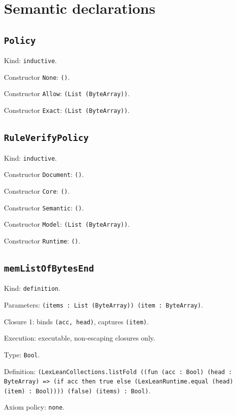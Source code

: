 \documentclass[11pt]{article}
\begin{document}
\section*{Semantic declarations}
\subsection*{\texttt{Policy}}
\noindent Kind: \texttt{inductive}.\par
\noindent Constructor \texttt{None}: \texttt{()}.\par
\noindent Constructor \texttt{Allow}: \texttt{(List (ByteArray))}.\par
\noindent Constructor \texttt{Exact}: \texttt{(List (ByteArray))}.\par
\subsection*{\texttt{RuleVerifyPolicy}}
\noindent Kind: \texttt{inductive}.\par
\noindent Constructor \texttt{Document}: \texttt{()}.\par
\noindent Constructor \texttt{Core}: \texttt{()}.\par
\noindent Constructor \texttt{Semantic}: \texttt{()}.\par
\noindent Constructor \texttt{Model}: \texttt{(List (ByteArray))}.\par
\noindent Constructor \texttt{Runtime}: \texttt{()}.\par
\subsection*{\texttt{memListOfBytesEnd}}
\noindent Kind: \texttt{definition}.\par
\noindent Parameters: \texttt{(items : List (ByteArray)) (item : ByteArray)}.\par
\noindent Closure 1: binds \texttt{(acc, head)}, captures \texttt{(item)}.\par
\noindent Execution: executable, non-escaping closures only.\par
\noindent Type: \texttt{Bool}.\par
\noindent Definition: \texttt{(LexLeanCollections.listFold ((fun (acc : Bool) (head : ByteArray) => (if acc then true else (LexLeanRuntime.equal (head) (item) : Bool)))) (false) (items) : Bool)}.\par
\noindent Axiom policy: \texttt{none}.\par
\end{document}
